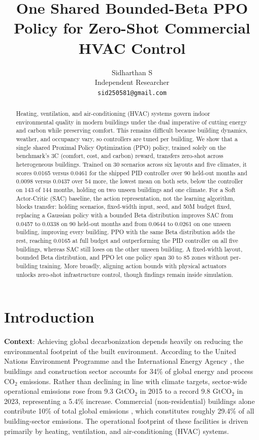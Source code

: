 \documentclass{article}
\title{One Shared Bounded-Beta PPO Policy for Zero-Shot Commercial HVAC Control}
\author{%
  Sidharthan S \\
  Independent Researcher \\
  \texttt{sid250581@gmail.com} \\
}
\begin{document}
\nocite{goldfeder2024smart,goldfeder2026smart}


\maketitle
\thispagestyle{empty}  %


\begin{abstract}
Heating, ventilation, and air-conditioning (HVAC) systems govern indoor environmental quality in modern buildings under the dual imperative of cutting energy and carbon while preserving comfort. This remains difficult because building dynamics, weather, and occupancy vary, so controllers are tuned per building. We show that a single shared Proximal Policy Optimization (PPO) policy, trained solely on the benchmark's 3C (comfort, cost, and carbon) reward, transfers zero-shot across heterogeneous buildings. Trained on 30 scenarios across six layouts and five climates, it scores 0.0165 versus 0.0461 for the shipped PID controller over 90 held-out months and 0.0098 versus 0.0437 over 54 more, the lowest mean on both sets, below the controller on 143 of 144 months, holding on two unseen buildings and one climate. For a Soft Actor-Critic (SAC) baseline, the action representation, not the learning algorithm, blocks transfer: holding scenarios, fixed-width input, seed, and 50M budget fixed, replacing a Gaussian policy with a bounded Beta distribution improves SAC from 0.0457 to 0.0338 on 90 held-out months and from 0.0644 to 0.0261 on one unseen building, improving every building. PPO with the same Beta distribution adds the rest, reaching 0.0165 at full budget and outperforming the PID controller on all five buildings, whereas SAC still loses on the other unseen building. A fixed-width layout, bounded Beta distribution, and PPO let one policy span 30 to 85 zones without per-building training. More broadly, aligning action bounds with physical actuators unlocks zero-shot infrastructure control, though findings remain inside simulation.
\end{abstract}


\section{Introduction}

\textbf{Context}: Achieving global decarbonization depends heavily on reducing the environmental footprint of the built environment. According to the United Nations Environment Programme \citep{unep2025buildings} and the International Energy Agency \citep{iea2018futureofcooling}, the buildings and construction sector accounts for 34\% of global energy and process $\text{CO}_2$ emissions. Rather than declining in line with climate targets, sector-wide operational emissions rose from 9.3 $\text{GtCO}_2$ in 2015 to a record 9.8 $\text{GtCO}_2$ in 2023, representing a 5.4\% increase. Commercial (non-residential) buildings alone contribute 10\% of total global emissions \citep{eia2018cbecs}, which constitutes roughly 29.4\% of all building-sector emissions. The operational footprint of these facilities is driven primarily by heating, ventilation, and air-conditioning (HVAC) systems.
\end{document}
